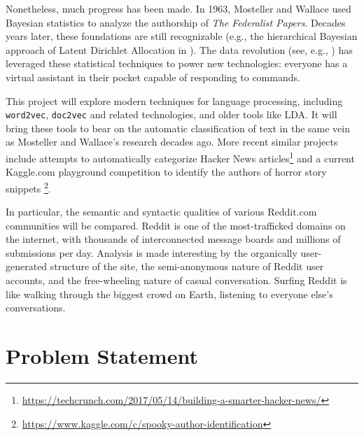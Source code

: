 \documentclass[]{article}
\begin{document}
Nonetheless, much progress has been made. In 1963, Mosteller and Wallace used Bayesian statistics to analyze the authorship of \emph{The Federalist Papers}\autocite{Mosteller1963}. Decades years later, these foundations are still recognizable (e.g., the hierarchical Bayesian approach of Latent Dirichlet Allocation in \cite{Blei2003}). The data revolution (see, e.g., \cite{fourthparadigm}) has leveraged these statistical techniques to power new technologies: everyone has a virtual assistant in their pocket capable of responding to commands.

This project will explore modern techniques for language processing, including \texttt{word2vec}, \texttt{doc2vec} and related technologies, and older tools like LDA. It will bring these tools to bear on the automatic classification of text in the same vein as Mosteller and Wallace's research decades ago. More recent similar projects include attempts to automatically categorize Hacker News articles\footnote{\url{https://techcrunch.com/2017/05/14/building-a-smarter-hacker-news/}} and a current Kaggle.com playground competition to identify the authors of horror story snippets \footnote{\url{https://www.kaggle.com/c/spooky-author-identification}}.

In particular, the semantic and syntactic qualities of various Reddit.com communities will be compared. Reddit is one of the most-trafficked domains on the internet, with thousands of interconnected message boards and millions of submissions per day\cite{redditblog:2015}. Analysis is made interesting by the organically user-generated structure of the site, the semi-anonymous nature of Reddit user accounts, and the free-wheeling nature of casual conversation. Surfing Reddit is like walking through the biggest crowd on Earth, listening to everyone else's conversations.

\section{Problem Statement}
\end{document}
